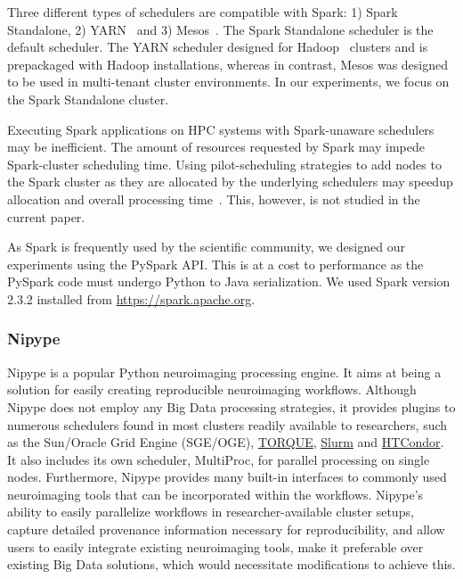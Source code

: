 Three different types of schedulers are compatible with Spark: 1) Spark
Standalone, 2) YARN~\cite{vavilapalli2013apache} and 3)
Mesos~\cite{hindman2011mesos}. The Spark Standalone scheduler is the default
scheduler. The YARN scheduler designed for Hadoop~\cite{white2012hadoop}
clusters and is prepackaged with Hadoop installations, whereas in contrast,
Mesos was designed to be used in multi-tenant cluster environments. In our
experiments, we focus on the Spark Standalone cluster.

Executing Spark applications on HPC systems with Spark-unaware schedulers may be
inefficient. The amount of resources requested by Spark may impede Spark-cluster
scheduling time. Using pilot-scheduling strategies to add nodes to the Spark
cluster as they are allocated by the underlying schedulers may speedup
allocation and overall processing time~\cite{paraskevakos2018pilot}. This,
however, is not studied in the current paper.

As Spark is frequently used by the scientific community, we designed our
experiments using the PySpark API. This is at a cost to performance as the
PySpark code must undergo Python to Java serialization. We used Spark version
2.3.2 installed from \url{https://spark.apache.org}.

\subsubsection{Nipype}

Nipype is a popular Python neuroimaging processing engine. It aims at being a
solution for easily creating reproducible neuroimaging workflows. Although
Nipype does not employ any Big Data processing strategies, it provides plugins
to numerous schedulers found in most clusters readily available to researchers,
such as the Sun/Oracle Grid Engine (SGE/OGE),
\href{http://www.adaptivecomputing.com/products/torque/}{TORQUE},
\href{https://slurm.schedmd.com/}{Slurm} and
\href{https://research.cs.wisc.edu/htcondor/}{HTCondor}. It also includes its
own scheduler, MultiProc, for parallel processing on single nodes. Furthermore,
Nipype provides many built-in interfaces to commonly used neuroimaging tools
that can be incorporated within the workflows. Nipype's ability to easily
parallelize workflows in researcher-available cluster setups, capture detailed
provenance information necessary for reproducibility, and allow users to easily
integrate existing neuroimaging tools, make it preferable over existing Big Data
solutions, which would necessitate modifications to achieve this.

